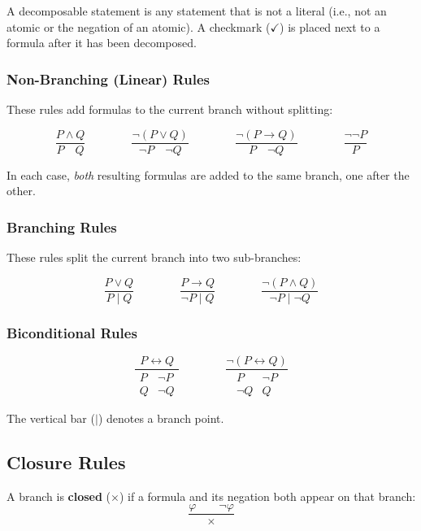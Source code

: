 \documentclass[12pt, letterpaper]{article}
\begin{document}
A decomposable statement is any statement that is not a literal (i.e., not an atomic or the negation of an atomic). A checkmark ($\checkmark$) is placed next to a formula after it has been decomposed.

\subsubsection*{Non-Branching (Linear) Rules}

These rules add formulas to the current branch without splitting:

\[
\frac{P \land Q}{P \quad Q} \qquad \qquad
\frac{\neg(P \lor Q)}{\neg P \quad \neg Q} \qquad \qquad
\frac{\neg(P \to Q)}{P \quad \neg Q} \qquad \qquad
\frac{\neg\neg P}{P}
\]

In each case, \textit{both} resulting formulas are added to the same branch, one after the other.

\subsubsection*{Branching Rules}

These rules split the current branch into two sub-branches:

\[
\frac{P \lor Q}{P \mid Q} \qquad \qquad
\frac{P \to Q}{\neg P \mid Q} \qquad \qquad
\frac{\neg(P \land Q)}{\neg P \mid \neg Q}
\]

\subsubsection*{Biconditional Rules}

\[
\frac{P \leftrightarrow Q}{\begin{array}{c|c} P & \neg P \\ Q & \neg Q \end{array}}
\qquad \qquad
\frac{\neg(P \leftrightarrow Q)}{\begin{array}{c|c} P & \neg P \\ \neg Q & Q \end{array}}
\]

The vertical bar ($\mid$) denotes a branch point.

\subsection*{Closure Rules}

A branch is \textbf{closed} ($\times$) if a formula and its negation both appear on that branch:
\[
\frac{\varphi \qquad \neg\varphi}{\times}
\]
\end{document}
